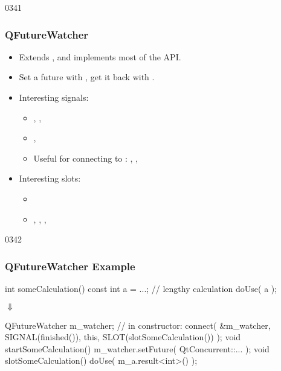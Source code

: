 \begin{slide}{0341}
\frametitle{QFutureWatcher}
\begin{itemize}
\item Extends , and implements most of the  API.
\item Set a future with , get it
  back with .
\item Interesting signals:
  \begin{itemize}
  \item%
    ,
    ,
  \item%
    ,
    
  \item Useful for connecting to : 
    ,
    ,
  \end{itemize}
\item Interesting slots:
  \begin{itemize}
  \item %
  \item %
    ,
    ,
    ,
  \end{itemize}
\end{itemize}
\end{slide}



\begin{slide}[fragile]{0342}
\frametitle{QFutureWatcher Example}
\begin{center}\footnotesize
\begin{cpp}
int someCalculation() {
  const int a = ...; // lengthy calculation
  doUse( a );
}
\end{cpp}
{\Huge$\Downarrow$}
\begin{cpp}
QFutureWatcher m_watcher;
// in constructor:
connect( &m_watcher, SIGNAL(finished()),
         this, SLOT(slotSomeCalculation()) );
void startSomeCalculation() {
  m_watcher.setFuture( QtConcurrent::... );
}
void slotSomeCalculation() {
  doUse( m_a.result<int>() );
}
\end{cpp}
\end{center}
\end{slide}

